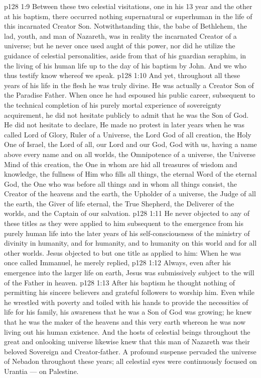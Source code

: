 \vs p128 1:9 Between these two celestial visitations, one in his 13 year and the other at his baptism, there occurred nothing supernatural or superhuman in the life of this incarnated Creator Son. Notwithstanding this, the babe of Bethlehem, the lad, youth, and man of Nazareth, was in reality the incarnated Creator of a universe; but he never once used aught of this power, nor did he utilize the guidance of celestial personalities, aside from that of his guardian seraphim, in the living of his human life up to the day of his baptism by John. And we who thus testify know whereof we speak.
\vs p128 1:10 And yet, throughout all these years of his life in the flesh he was truly divine. He was actually a Creator Son of the Paradise Father. When once he had espoused his public career, subsequent to the technical completion of his purely mortal experience of sovereignty acquirement, he did not hesitate publicly to admit that he was the Son of God. He did not hesitate to declare,  He made no protest in later years when he was called Lord of Glory, Ruler of a Universe, the Lord God of all creation, the Holy One of Israel, the Lord of all, our Lord and our God, God with us, having a name above every name and on all worlds, the Omnipotence of a universe, the Universe Mind of this creation, the One in whom are hid all treasures of wisdom and knowledge, the fullness of Him who fills all things, the eternal Word of the eternal God, the One who was before all things and in whom all things consist, the Creator of the heavens and the earth, the Upholder of a universe, the Judge of all the earth, the Giver of life eternal, the True Shepherd, the Deliverer of the worlds, and the Captain of our salvation.
\vs p128 1:11 \pc He never objected to any of these titles as they were applied to him subsequent to the emergence from his purely human life into the later years of his self\hyp{}consciousness of the ministry of divinity in humanity, and for humanity, and to humanity on this world and for all other worlds. Jesus objected to but one title as applied to him: When he was once called Immanuel, he merely replied, 
\vs p128 1:12 Always, even after his emergence into the larger life on earth, Jesus was submissively subject to the will of the Father in heaven.
\vs p128 1:13 After his baptism he thought nothing of permitting his sincere believers and grateful followers to worship him. Even while he wrestled with poverty and toiled with his hands to provide the necessities of life for his family, his awareness that he was a Son of God was growing; he knew that he was the maker of the heavens and this very earth whereon he was now living out his human existence. And the hosts of celestial beings throughout the great and onlooking universe likewise knew that this man of Nazareth was their beloved Sovereign and Creator\hyp{}father. A profound suspense pervaded the universe of Nebadon throughout these years; all celestial eyes were continuously focused on Urantia --- on Palestine.
